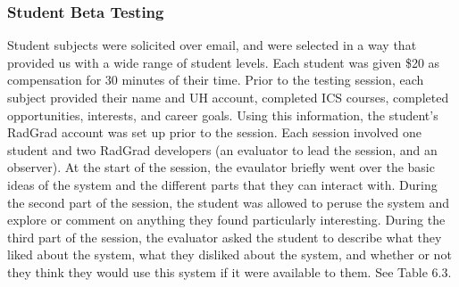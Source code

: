 \subsubsection{Student Beta Testing}
Student subjects were solicited over email, and were selected in a way that provided us with a wide range of student levels. Each student was given \$20 as compensation for 30 minutes of their time. Prior to the testing session, each subject provided their name and UH account, completed ICS courses, completed opportunities, interests, and career goals. Using this information, the student's RadGrad account was set up prior to the session. Each session involved one student and two RadGrad developers (an evaluator to lead the session, and an observer). At the start of the session, the evaulator briefly went over the basic ideas of the system and the different parts that they can interact with. During the second part of the session, the student was allowed to peruse the system and explore or comment on anything they found particularly interesting. During the third part of the session, the evaluator asked the student to describe what they liked about the system, what they disliked about the system, and whether or not they think they would use this system if it were available to them. See Table 6.3.


